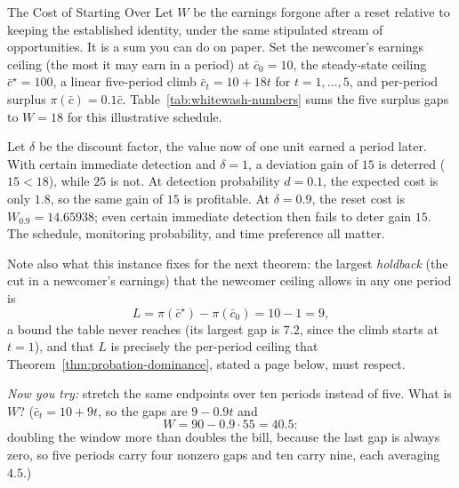 \documentclass[11pt,a4paper]{article}
\theoremstyle{definition}
\begin{document}
\begin{pdexample}{The Cost of Starting Over}
\setlength{\parskip}{4pt plus 1pt}
\label{ex:maturation-cost}
Let $W$ be the earnings forgone after a reset relative to keeping the established
identity, under the same stipulated stream of opportunities. It is a sum you can
do on paper. Set the newcomer's earnings ceiling (the most it may earn in a
period) at $\bar{c}_0=10$, the steady-state ceiling $\bar{c}^\star=100$, a
linear five-period climb $\bar{c}_t = 10 + 18t$ for $t=1,\ldots,5$, and per-period surplus
$\pi(\bar{c})=0.1\bar{c}$. Table~\ref{tab:whitewash-numbers} sums the five
surplus gaps to $W=18$ for this illustrative schedule.

Let $\delta$ be the discount factor, the value now of one unit earned a period
later. With certain immediate detection and $\delta=1$, a deviation gain of
$15$ is deterred ($15<18$), while $25$ is not. At detection probability
$d=0.1$, the expected cost is only $1.8$, so the same gain of $15$ is
profitable. At $\delta=0.9$, the reset cost is $W_{0.9}=14.65938$;
even certain immediate detection then fails to deter gain $15$.
The schedule, monitoring probability, and time preference all matter.

Note also what this
instance fixes for the next theorem: the largest \emph{holdback} (the cut in a
newcomer's earnings) that the newcomer ceiling allows in any one period is
\[
L=\pi(\bar{c}^\star)-\pi(\bar{c}_0)=10-1=9,
\]
a bound the table never reaches (its largest gap is $7.2$, since the climb
starts at $t=1$), and that $L$ is precisely
the per-period ceiling that Theorem~\ref{thm:probation-dominance}, stated a
page below, must respect.

\emph{Now you try:} stretch the same endpoints over ten periods instead of five.
What is $W$? ($\bar{c}_t=10+9t$, so the gaps are $9-0.9t$ and
\[
W=90-0.9\cdot 55=40.5:
\]
doubling the window more than doubles the bill, because the last gap is
always zero, so five periods carry four nonzero gaps and ten carry nine, each
averaging $4.5$.)
\end{pdexample}
\end{document}
